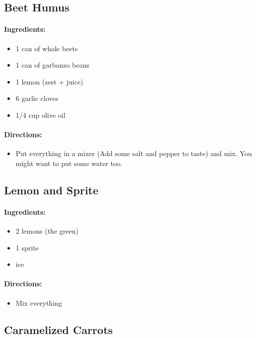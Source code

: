 \documentclass{article}
\begin{document}
\subsection{Beet Humus}

\paragraph{Ingredients:}
\begin{itemize}
    \item 1 can of whole beets
    \item 1 can of garbanzo beans
    \item 1 lemon (zest + juice)
    \item 6 garlic cloves
    \item 1/4 cup olive oil
\end{itemize}

\paragraph{Directions:}
\begin{itemize}
    \item Put everything in a mixer (Add some salt and pepper to taste) and mix. You might want to put some water too.
\end{itemize}

\subsection{Lemon and Sprite}

\paragraph{Ingredients:}
\begin{itemize}
    \item 2 lemons (the green)
    \item 1 sprite
    \item ice
\end{itemize}

\paragraph{Directions:}
\begin{itemize}
    \item Mix everything
\end{itemize}

\subsection{Caramelized Carrots}
\end{document}
